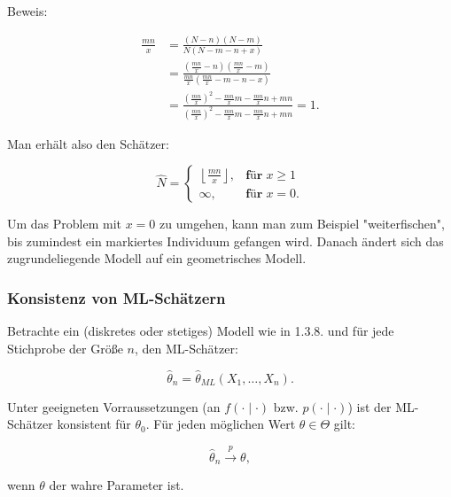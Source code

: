 \documentclass[10pt]{article}
\newcommand{\FZV}{X_1, \ldots, X_n} %
\newcommand{\KW}{\overset{p} \longrightarrow} %
\newenvironment{BSP}[1][]
{\begin{Beispiel}[frametitle=#1]}{\end{Beispiel}}
\begin{document}
\begin{BSP}[Beispiel 1.3.9 (Schätzung der Populationsgröße mit der Capture/Recapture-Methode)]
		Beweis:
		
		\begin{equation*}
			\begin{split}
				\frac{mn}{x} &= \frac{(N-n)(N-m)}{N(N-m-n+x)}\\  
				&= \frac{\left(\frac{mn}{x}-n\right)\left(\frac{mn}{x} -m\right)}{\frac{mn}{x}\left(\frac{mn}{x}-m-n-x\right)}\\
				&= \frac{\left(\frac{mn}{x}\right)^2 -\frac{mn}{x}m -\frac{mn}{x}n +mn} {\left(\frac{mn}{x}\right)^2 - \frac{mn}{x}m -\frac{mn}{x}n + mn} =1.
			\end{split}
		\end{equation*}
		
		Man erhält also den Schätzer:
		
		\begin{equation*}
			\hat{N} = 
			\begin{cases}
				\left\lfloor \frac{mn}{x} \right\rfloor, &\textbf{für} \; x \geq 1 \\
				\infty,  &\textbf{für} \; x =0.
			\end{cases}
		\end{equation*}
		
		Um das Problem mit $x=0$ zu umgehen, kann man zum Beispiel "weiterfischen", bis zumindest ein markiertes Individuum gefangen wird. Danach ändert sich das zugrundeliegende Modell auf ein geometrisches Modell. 
	\end{BSP}
	
	\subsubsection{Konsistenz von ML-Schätzern}
	
	Betrachte ein (diskretes oder stetiges) Modell wie in 1.3.8. und für jede Stichprobe der Größe $n$, den ML-Schätzer:
	
	\begin{equation*}
		\hat{\theta}_n = \hat{\theta}_{ML}(\FZV).
	\end{equation*}
	
	\begin{Satz}
	Unter geeigneten Vorraussetzungen (an $f(\cdot \mid \cdot)$ bzw. $p(\cdot \mid \cdot)$) ist der ML-Schätzer konsistent für $\theta_0$. Für jeden möglichen Wert $\theta \in \Theta$ gilt:
	
	\begin{equation*}
		\hat{\theta}_n \KW \theta,
	\end{equation*}
	
	wenn $\theta$ der wahre Parameter ist. 
	\end{Satz}
	
\end{document}
